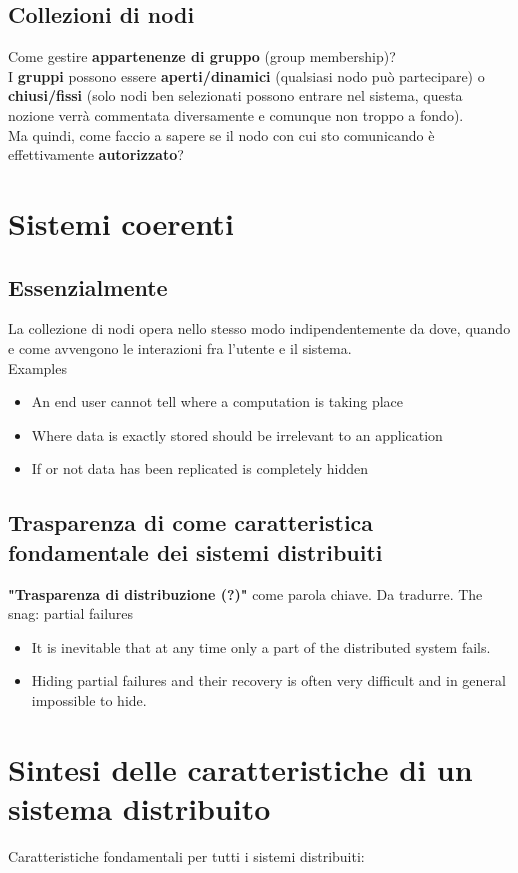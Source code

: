 \subsection{Collezioni di nodi}
Come gestire \textbf{appartenenze di gruppo} (group membership)?
\\I \textbf{gruppi} possono essere \textbf{aperti/dinamici} (qualsiasi nodo può partecipare) o \textbf{chiusi/fissi} (solo nodi ben selezionati possono entrare nel sistema, questa nozione verrà commentata diversamente e comunque non troppo a fondo).
\\Ma quindi, come faccio a sapere se il nodo con cui sto comunicando è effettivamente \textbf{autorizzato}?

\section{Sistemi coerenti}
\subsection{Essenzialmente}
La collezione di nodi opera nello stesso modo indipendentemente da dove, quando e come avvengono le interazioni fra l'utente e il sistema.
\\Examples
\begin{itemize}
    \item An end user cannot tell where a computation is taking place
    \item Where data is exactly stored should be irrelevant to an application
    \item If or not data has been replicated is completely hidden
\end{itemize}

\subsection{Trasparenza di come caratteristica fondamentale dei sistemi distribuiti}
\textbf{"Trasparenza di distribuzione (?)"} come parola chiave. Da tradurre.
The snag: partial failures
\begin{itemize}
    \item It is inevitable that at any time only a part of the distributed system fails.
    \item Hiding partial failures and their recovery is often very difficult and in general impossible to hide.
\end{itemize}

\section{Sintesi delle caratteristiche di un sistema distribuito}
Caratteristiche fondamentali per tutti i sistemi distribuiti:
